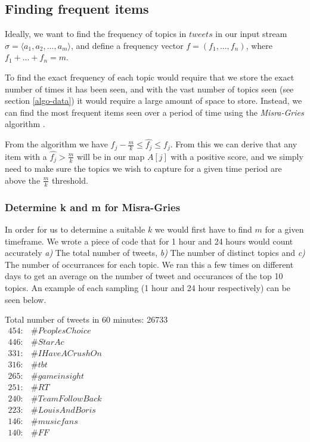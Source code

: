 \subsection{Finding frequent items}\label{algo-frequent}
Ideally, we want to find the frequency of topics in $tweets$ in our input stream $\sigma = \langle a_{1}, a_{2},...,a_{m}\rangle$, and define a frequency vector $f = (f_{1},...,f_{n})$, where $f_{1} + ... + f_{n} = m$. 

To find the exact frequency of each topic would require that we store the exact number of times it has been seen, and with the vast number of topics seen (see section \ref{algo-data}) it would require a large amount of space to store. Instead, we can find the most frequent items seen over a period of time using the \textit{Misra-Gries} algorithm \cite{Amit}.
\newline

From the algorithm we have $f_j - \frac{m}{k} \leq \hat{f_j} \leq f_j$. From this we can derive that any item with a $\hat{f_j} > \frac{m}{k}$ will be in our map $A[j]$ with a positive score, and we simply need to make sure the topics we wish to capture for a given time period are above the $\frac{m}{k}$ threshold.

\subsubsection{Determine k and m for Misra-Gries}
In order for us to determine a suitable $k$ we would first have to find $m$ for a given timeframe. We wrote a piece of code that for 1 hour and 24 hours would count accurately \textit{a)} The total number of tweets, \textit{b)} The number of distinct topics and \textit{c)} The number of occurrances for each topic. We ran this a few times on different days to get an average on the number of tweet and occurances of the top 10 topics. An example of each sampling (1 hour and 24 hour respectively) can be seen below.\newline

Total number of tweets in 60 minutes: 26733\\

$\begin{array}{ll}
    454: & \#PeoplesChoice \\
    446: & \#StarAc \\
    331: & \#IHaveACrushOn \\
    316: & \#tbt \\
    265: & \#gameinsight \\
    251: & \#RT \\
    240: & \#TeamFollowBack \\
    223: & \#LouisAndBoris \\
    146: & \#musicfans \\
    140: & \#FF \\
\end{array}$
\\
\\

